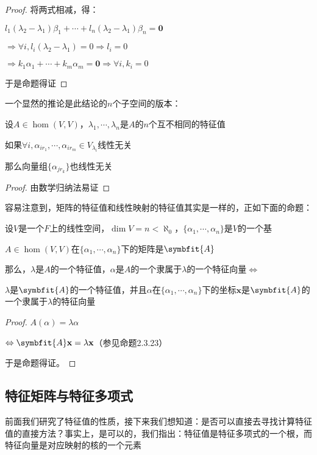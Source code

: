 \documentclass[12pt, a4paper, oneside, UTF8]{ctexbook}
\begin{document}
\begin{para}{0}
\begin{proof}
						将两式相减，得：

						$l_1(\lambda_2-\lambda_1)\beta_1+\cdots+l_n(\lambda_2-\lambda_1)\beta_n=\mathbf{0}$

						$\Rightarrow \forall i,l_i(\lambda_2-\lambda_1)=0 \Rightarrow l_i=0$

						$\Rightarrow k_1\alpha_1+\cdots+k_m\alpha_m=\mathbf{0} \Rightarrow \forall i, k_i =0$

						于是命题得证
					\end{proof}
					一个显然的推论是此结论的$n$个子空间的版本：
					\begin{corollary}{}
						设$A \in \hom(V,V)$，$\lambda_1,\cdots,\lambda_n$是$A$的$n$个互不相同的特征值

						如果$\forall i,\alpha_{ir_1},\cdots,\alpha_{ir_m} \in V_{\lambda_i}$线性无关

						那么向量组$\{\alpha_{jr_k}\}$也线性无关
					\end{corollary}
					\begin{proof}
						由数学归纳法易证
					\end{proof}
				\point{}
					
					容易注意到，矩阵的特征值和线性映射的特征值其实是一样的，正如下面的命题：
					\begin{proposition}
						设$V$是一个$F$上的线性空间，$\dim V = n < \aleph_0$，$\{\alpha_1,\cdots,\alpha_n\}$是$V$的一个基

						$A \in \hom(V,V)$在$\{\alpha_1,\cdots,\alpha_n\}$下的矩阵是$\symbfit{A}$

						那么，$\lambda $是$A$的一个特征值，$\alpha $是$A$的一个隶属于$\lambda $的一个特征向量$\Leftrightarrow$

						$\lambda $是$\symbfit{A}$的一个特征值，并且$\alpha $在$\{\alpha_1,\cdots,\alpha_n\}$下的坐标$\mathbf{x}$是$\symbfit{A}$的一个隶属于$\lambda $的特征向量
					\end{proposition}
					\begin{proof}
						$A(\alpha )=\lambda \alpha $

						$\Leftrightarrow \symbfit{A}\mathbf{x}=\lambda \mathbf{x}$（参见命题2.3.23）

						于是命题得证。
					\end{proof}
			\end{para}
		\subsection{特征矩阵与特征多项式}
			前面我们研究了特征值的性质，接下来我们想知道：是否可以直接去寻找计算特征值的直接方法？事实上，是可以的，我们指出：特征值是特征多项式的一个根，而特征向量是对应映射的核的一个元素
\end{document}
